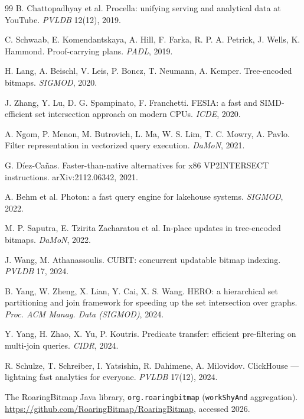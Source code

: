 \documentclass[sigconf,nonacm]{acmart}
\begin{document}
\begin{thebibliography}{99}
 B. Chattopadhyay et al. Procella: unifying
serving and analytical data at YouTube. \emph{PVLDB} 12(12), 2019.

 C. Schwaab, E. Komendantskaya, A. Hill, F. Farka,
R. P. A. Petrick, J. Wells, K. Hammond. Proof-carrying plans.
\emph{PADL}, 2019.

 H. Lang, A. Beischl, V. Leis, P. Boncz, T. Neumann,
A. Kemper. Tree-encoded bitmaps. \emph{SIGMOD}, 2020.

 J. Zhang, Y. Lu, D. G. Spampinato, F. Franchetti.
FESIA: a fast and SIMD-efficient set intersection approach on modern
CPUs. \emph{ICDE}, 2020.

 A. Ngom, P. Menon, M. Butrovich, L. Ma, W. S. Lim,
T. C. Mowry, A. Pavlo. Filter representation in vectorized query
execution. \emph{DaMoN}, 2021.

 G. D\'iez-Ca\~nas. Faster-than-native alternatives
for x86 VP2INTERSECT instructions. arXiv:2112.06342, 2021.

 A. Behm et al. Photon: a fast query engine for
lakehouse systems. \emph{SIGMOD}, 2022.

 M. P. Saputra, E. Tzirita Zacharatou et al. In-place
updates in tree-encoded bitmaps. \emph{DaMoN}, 2022.

 J. Wang, M. Athanassoulis. CUBIT: concurrent
updatable bitmap indexing. \emph{PVLDB} 17, 2024.

 B. Yang, W. Zheng, X. Lian, Y. Cai, X. S. Wang.
HERO: a hierarchical set partitioning and join framework for speeding
up the set intersection over graphs. \emph{Proc. ACM Manag. Data
(SIGMOD)}, 2024.

 Y. Yang, H. Zhao, X. Yu, P. Koutris.
Predicate transfer: efficient pre-filtering on multi-join queries.
\emph{CIDR}, 2024.

 R. Schulze, T. Schreiber, I. Yatsishin,
R. Dahimene, A. Milovidov. ClickHouse --- lightning fast analytics for
everyone. \emph{PVLDB} 17(12), 2024.

 The RoaringBitmap Java library,
\texttt{org.roaringbitmap} (\texttt{workShyAnd} aggregation).
\url{https://github.com/RoaringBitmap/RoaringBitmap}, accessed 2026.

\end{thebibliography}
\end{document}
